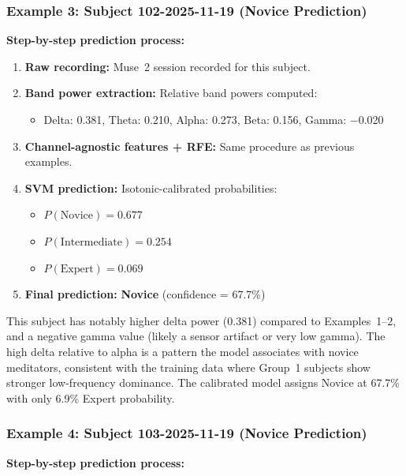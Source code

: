 \documentclass[12pt,a4paper]{article}
\begin{document}
\subsubsection{Example 3: Subject 102-2025-11-19 (Novice Prediction)}

\textbf{Step-by-step prediction process:}

\begin{enumerate}
  \item \textbf{Raw recording:} Muse~2 session recorded for this subject.
  \item \textbf{Band power extraction:} Relative band powers computed:
  \begin{itemize}
    \item Delta: 0.381, Theta: 0.210, Alpha: 0.273, Beta: 0.156, Gamma: $-$0.020
  \end{itemize}
  \item \textbf{Channel-agnostic features + RFE:} Same procedure as previous examples.
  \item \textbf{SVM prediction:} Isotonic-calibrated probabilities:
  \begin{itemize}
    \item $P(\text{Novice}) = 0.677$
    \item $P(\text{Intermediate}) = 0.254$
    \item $P(\text{Expert}) = 0.069$
  \end{itemize}
  \item \textbf{Final prediction:} \textbf{Novice} (confidence = 67.7\%)
\end{enumerate}

This subject has notably higher delta power (0.381) compared to Examples~1--2, and a negative gamma value (likely a sensor artifact or very low gamma). The high delta relative to alpha is a pattern the model associates with novice meditators, consistent with the training data where Group~1 subjects show stronger low-frequency dominance. The calibrated model assigns Novice at 67.7\% with only 6.9\% Expert probability.

\subsubsection{Example 4: Subject 103-2025-11-19 (Novice Prediction)}

\textbf{Step-by-step prediction process:}
\end{document}
